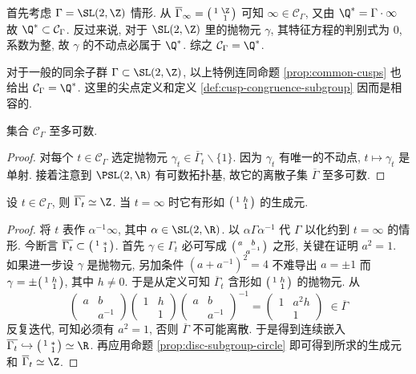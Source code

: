 \begin{example}
	首先考虑 $\Gamma = \SL(2,\Z)$ 情形. 从 $\overline{\Gamma}_\infty = \twomatrix{1}{\Z}{}{1}$ 可知 $\infty \in \mathcal{C}_\Gamma$, 又由 $\Q^* = \Gamma \cdot \infty$ 故 $\Q^* \subset \mathcal{C}_\Gamma$. 反过来说, 对于 $\SL(2,\Z)$ 里的抛物元 $\gamma$, 其特征方程的判别式为 $0$, 系数为整, 故 $\gamma$ 的不动点必属于 $\Q^*$. 综之 $\mathcal{C}_\Gamma = \Q^*$.
	
	对于一般的同余子群 $\Gamma \subset \SL(2,\Z)$, 以上特例连同命题 \ref{prop:common-cusps} 也给出 $\mathcal{C}_\Gamma = \Q^*$. 这里的尖点定义和定义 \ref{def:cusp-congruence-subgroup} 因而是相容的.
\end{example}

\begin{lemma}\label{prop:cusp-countable}
	集合 $\mathcal{C}_\Gamma$ 至多可数.
\end{lemma}
\begin{proof}
	对每个 $t \in \mathcal{C}_\Gamma$ 选定抛物元 $\gamma_t \in \overline{\Gamma}_t \smallsetminus \{1\}$. 因为 $\gamma_t$ 有唯一的不动点, $t \mapsto \gamma_t$ 是单射. 接着注意到 $\PSL(2,\R)$ 有可数拓扑基, 故它的离散子集 $\overline{\Gamma}$ 至多可数.
\end{proof}

\begin{lemma}\label{prop:cusp-stabilizer}
	设 $t \in \mathcal{C}_\Gamma$, 则 $\overline{\Gamma_t} \simeq \Z$. 当 $t=\infty$ 时它有形如 $\bigl(\begin{smallmatrix} 1 & h \\  & 1 \end{smallmatrix}\bigr)$ 的生成元.
\end{lemma}
\begin{proof}
	将 $t$ 表作 $\alpha^{-1}\infty$, 其中 $\alpha \in \SL(2,\R)$. 以 $\alpha\Gamma\alpha^{-1}$ 代 $\Gamma$ 以化约到 $t=\infty$ 的情形. 今断言 $\overline{\Gamma_t} \subset \bigl(\begin{smallmatrix} 1 & * \\  & 1 \end{smallmatrix}\bigr)$. 首先 $\gamma \in \Gamma_t$ 必可写成 $\bigl(\begin{smallmatrix} a & b \\  & a^{-1} \end{smallmatrix}\bigr)$ 之形, 关键在证明 $a^2 = 1$. 如果进一步设 $\gamma$ 是抛物元, 另加条件 $(a+a^{-1})^2 = 4$ 不难导出 $a = \pm 1$ 而 $\gamma = \pm\bigl(\begin{smallmatrix} 1 & h \\  & 1 \end{smallmatrix}\bigr)$, 其中 $h \neq 0$. 于是从定义可知 $\overline{\Gamma}_t$ 含形如 $\bigl(\begin{smallmatrix} 1 & h \\  & 1 \end{smallmatrix}\bigr)$ 的抛物元. 从
	\[ \begin{pmatrix} a & b \\ & a^{-1} \end{pmatrix} \begin{pmatrix} 1 & h \\ & 1 \end{pmatrix} \left(\begin{matrix} a & b \\ & a^{-1} \end{matrix}\right)^{-1} = \begin{pmatrix} 1 & a^2 h \\ & 1 \end{pmatrix} \; \in \overline{\Gamma} \]
	反复迭代, 可知必须有 $a^2=1$, 否则 $\overline{\Gamma}$ 不可能离散. 于是得到连续嵌入 $\overline{\Gamma_t} \hookrightarrow \twomatrix{1}{*}{}{1} \simeq \R$. 再应用命题 \ref{prop:disc-subgroup-circle} 即可得到所求的生成元和 $\overline{\Gamma}_t \simeq \Z$.
\end{proof}

